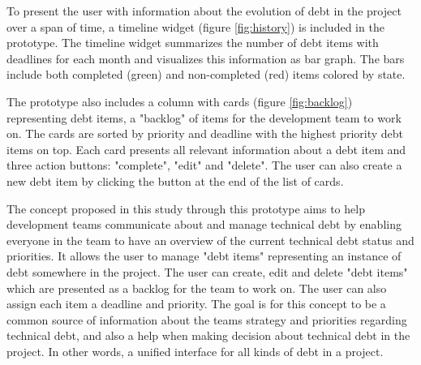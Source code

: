 

To present the user with information about the evolution of debt in the project over a span of time, a timeline widget (figure \ref{fig:history}) is included in the prototype.
The timeline widget summarizes the number of debt items with deadlines for each month and visualizes this information as bar graph.
The bars include both completed (green) and non-completed (red) items colored by state.

The prototype also includes a column with cards (figure \ref{fig:backlog}) representing debt items, a "backlog" of items for the development team to work on.
The cards are sorted by priority and deadline with the highest priority debt items on top.
Each card presents all relevant information about a debt item and three action buttons: "complete", "edit" and "delete".
The user can also create a new debt item by clicking the button at the end of the list of cards.



The concept proposed in this study through this prototype aims to help development teams communicate about and manage technical debt by enabling everyone in the team to have an overview of the current technical debt status and priorities.
It allows the user to manage "debt items" representing an instance of debt somewhere in the project.
The user can create, edit and delete "debt items" which are presented as a backlog for the team to work on.
The user can also assign each item a deadline and priority. 
The goal is for this concept to be a common source of information about the teams strategy and priorities regarding technical debt, and also a help when making decision about technical debt in the project.
In other words, a unified interface for all kinds of debt in a project.